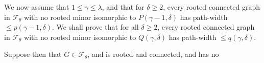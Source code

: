 
We now assume that $1\le\gamma\le\lambda$, and that for $\delta\ge 2$, every rooted connected
graph in $\mathscr{F}_\theta$ with no rooted minor isomorphic to $P(\gamma-1, \delta)$ has path-width
$\le p(\gamma-1, \delta)$. We shall prove that for all $\delta\ge 2$, every rooted connected
graph in $\mathscr{F}_\theta$ with no rooted minor isomorphic to $Q(\gamma, \delta)$ has path-width
$\le q(\gamma, \delta)$.

Suppose then that $G\in\mathscr{F}_\theta$, and is rooted and connected, and has no
